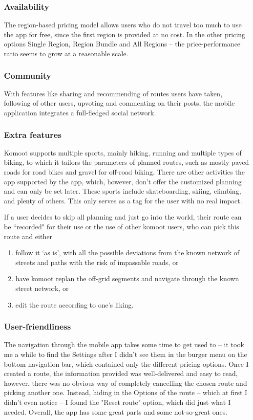 \subsubsection*{Availability}
The region-based pricing model allows users who do not travel too much to use the app for free,
since the first region is provided at no cost.
In the other pricing options Single Region, Region Bundle and All Regions -- the price-performance ratio seems to grow at a reasonable scale.
\subsubsection*{Community}
With features like sharing and recommending of routes users have taken, following of other users, upvoting and commenting on their posts, the mobile application integrates a full-fledged social network.
\subsubsection*{Extra features}
Komoot supports multiple sports, mainly hiking, running and multiple types of biking, to which it tailors the parameters of planned routes, such as mostly paved roads for road bikes and gravel for off-road biking.
There are other activities the app supported by the app, which, however, don't offer the customized planning and can only be set later.
These sports include skateboarding, skiing, climbing, and plenty of others.
This only serves as a tag for the user with no real impact.

If a user decides to skip all planning and just go into the world, their route can be ``recorded" for their use or the use of other komoot users, who can pick this route and either
\begin{enumerate}[label=(\alph*)]
    \item follow it `as is', with all the possible deviations from the known network of streets and paths with the risk of impassable roads, or
    \item have komoot replan the off-grid segments and navigate through the known street network, or
    \item edit the route according to one's liking.
\end{enumerate}

\subsubsection*{User-friendliness}
The navigation through the mobile app takes some time to get used to -- it took me a while to find the Settings after I didn't see them in the burger menu on the bottom navigation bar, which contained only the different pricing options.
Once I created a route, the information provided was well-delivered and easy to read, however, there was no obvious way of completely cancelling the chosen route and picking another one.
Instead, hiding in the Options of the route -- which at first I didn't even notice -- I found the "Reset route" option, which did just what I needed.
Overall, the app has some great parts and some not-so-great ones.
